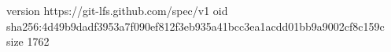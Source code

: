 version https://git-lfs.github.com/spec/v1
oid sha256:4d49b9dadf3953a7f090ef812f3eb935a41bcc3ea1acdd01bb9a9002cf8c159c
size 1762
